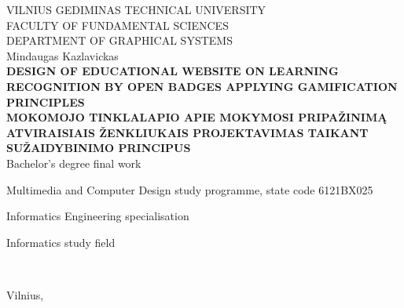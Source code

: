 \begin{titlepage}
\setcounter{page}{-1}
\centering
%
{\Large\scshape VILNIUS GEDIMINAS TECHNICAL UNIVERSITY}\\[0.2\baselineskip]
{\scshape FACULTY OF FUNDAMENTAL SCIENCES}\\[0.2\baselineskip]
{\scshape DEPARTMENT OF GRAPHICAL SYSTEMS}\\[0.2\baselineskip]
%
\vspace{\fill}
%
%
\vspace{\fill}
%
{Mindaugas Kazlavickas}\\[3.0\baselineskip]

\MakeUppercase{\Large\bfseries Design of educational website on learning recognition by open badges applying gamification principles}\\[1.0\baselineskip]
\MakeUppercase{\Large\bfseries Mokomojo tinklalapio apie mokymosi pripažinimą atviraisiais ženkliukais projektavimas taikant sužaidybinimo principus}\\[1\baselineskip]

{Bachelor's degree final work}

\vspace{\fill}

Multimedia and Computer Design study programme, state code 6121BX025

Informatics Engineering specialisation

Informatics study field

\vspace{\fill}
%
\begin{flushright}
\parbox{0.7\textwidth}{
    \\
    \hspace*{3cm}
}
\end{flushright}
%
\vspace{\fill}
%
Vilnius, \the\year
\end{titlepage}